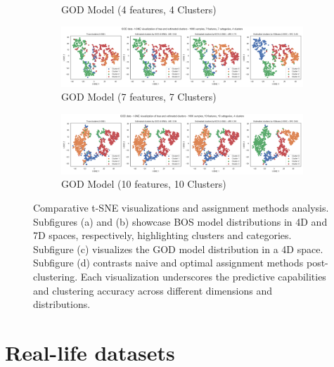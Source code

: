 \begin{figure}[H]
\begin{subfigure}[b]{0.49\textwidth}
        \caption{GOD Model (4 features, 4 Clusters)}
        \label{fig:tsne_god_4d}
    \end{subfigure}
    \newline
    \begin{subfigure}[b]{0.49\textwidth}
        \includegraphics[width=\textwidth]{python_figures/tsne_god_n1000_d7_m7_k4.png}
        \caption{GOD Model (7 features, 7 Clusters)}
        \label{fig:tsne_god_7d}
    \end{subfigure}
    \hfill
    \begin{subfigure}[b]{0.49\textwidth}
        \includegraphics[width=\textwidth]{python_figures/tsne_god_n1000_d10_m10_k4.png}
        \caption{GOD Model (10 features, 10 Clusters)}
        \label{fig:tsne_god_10d}
    \end{subfigure}
    \caption{Comparative t-SNE visualizations and assignment methods analysis. Subfigures (a) and (b) showcase BOS model distributions in 4D and 7D spaces, respectively, highlighting clusters and categories. Subfigure (c) visualizes the GOD model distribution in a 4D space. Subfigure (d) contrasts naive and optimal assignment methods post-clustering. Each visualization underscores the predictive capabilities and clustering accuracy across different dimensions and distributions.}
    \label{fig:tsne_comparative_analysis}
\end{figure}

\section{Real-life datasets}
\label{appendix:metrics_real}


